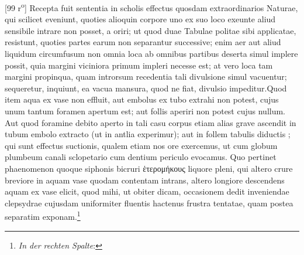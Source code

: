                 \vspace*{8mm}
                \pstart 
                \normalsize
            [99 r\textsuperscript{o}]  Recepta fuit sententia in scholis effectus quosdam  extraordinarios Naturae, qui scilicet eveniunt, quoties  alioquin corpore uno ex suo loco exeunte aliud sensibile  intrare non posset, a  \protect{} oriri; ut quod  duae Tabulae politae\protect{} sibi applicatae,  resistunt, quoties  partes earum non separantur successive;   enim aer aut aliud liquidum circumfusum non omnia  loca ab omnibus partibus deserta simul implere possit,  quia margini viciniora primum impleri necesse est;  at vero loca tam margini propinqua, quam  introrsum recedentia tali divulsione simul vacuentur;  sequeretur, inquiunt, ea vacua mansura, quod ne fiat,  divulsio impeditur.\pend \pstart  Quod item aqua ex vase  non effluit, aut embolus\protect{} ex tubo extrahi non potest,  cujus unum tantum foramen apertum est; aut follis  aperiri non potest cujus nullum. Aut quod foramine  debito aperto in tali casu corpus etiam alias  grave ascendit in tubum embolo\protect{} extracto (ut in antlia  experimur); aut in follem tabulis diductis ; qui  sunt effectus suctionis, qualem etiam nos ore exercemus,  ut cum  globum plumbeum  canali sclopetario\protect{}  cum dentium periculo evocamus. Quo  pertinet phaenomenon quoque siphonis\protect{} bicruri
            ἑτερομήκους %
            liquore pleni, qui altero crure breviore  in aquam vase quodam contentam intrans, altero  longiore   descendens aquam ex vase elicit, quod mihi, ut obiter dicam, occasionem  dedit inveniendae clepsydrae\protect{} cujusdam uniformiter  fluentis hactenus frustra tentatae, quam postea  separatim exponam.\footnote{\textit{In der rechten Spalte}: } \pend 

